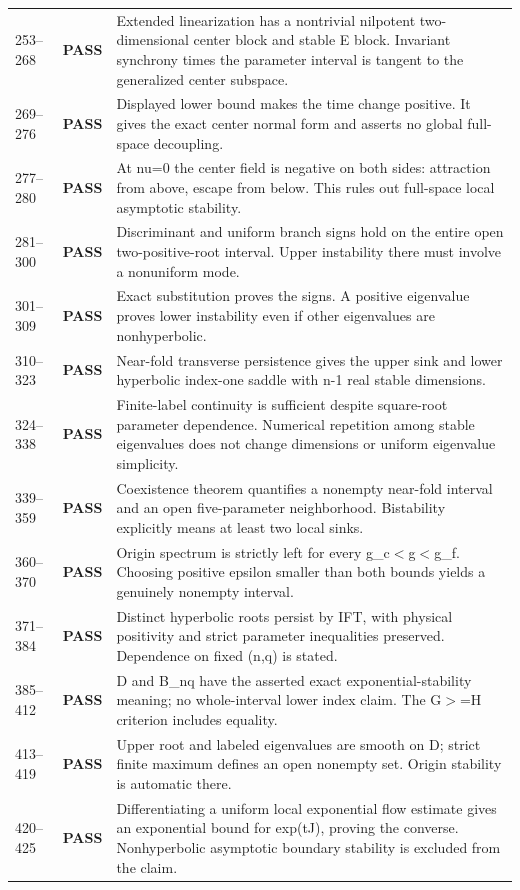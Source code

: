 \documentclass[11pt]{article}
\newcommand{\pass}{\textbf{PASS}}
\begin{document}
\begin{longtable}{@{}p{}p{}p{}@{}}
253--268 & \pass & Extended linearization has a nontrivial nilpotent two-dimensional center block and stable E block. Invariant synchrony times the parameter interval is tangent to the generalized center subspace.\\
269--276 & \pass & Displayed lower bound makes the time change positive. It gives the exact center normal form and asserts no global full-space decoupling.\\
277--280 & \pass & At nu=0 the center field is negative on both sides: attraction from above, escape from below. This rules out full-space local asymptotic stability.\\
281--300 & \pass & Discriminant and uniform branch signs hold on the entire open two-positive-root interval. Upper instability there must involve a nonuniform mode.\\
301--309 & \pass & Exact substitution proves the signs. A positive eigenvalue proves lower instability even if other eigenvalues are nonhyperbolic.\\
310--323 & \pass & Near-fold transverse persistence gives the upper sink and lower hyperbolic index-one saddle with n-1 real stable dimensions.\\
324--338 & \pass & Finite-label continuity is sufficient despite square-root parameter dependence. Numerical repetition among stable eigenvalues does not change dimensions or uniform eigenvalue simplicity.\\
339--359 & \pass & Coexistence theorem quantifies a nonempty near-fold interval and an open five-parameter neighborhood. Bistability explicitly means at least two local sinks.\\
360--370 & \pass & Origin spectrum is strictly left for every g\_c\ensuremath{<}g\ensuremath{<}g\_f. Choosing positive epsilon smaller than both bounds yields a genuinely nonempty interval.\\
371--384 & \pass & Distinct hyperbolic roots persist by IFT, with physical positivity and strict parameter inequalities preserved. Dependence on fixed (n,q) is stated.\\
385--412 & \pass & D and B\_nq have the asserted exact exponential-stability meaning; no whole-interval lower index claim. The G\ensuremath{>}=H criterion includes equality.\\
413--419 & \pass & Upper root and labeled eigenvalues are smooth on D; strict finite maximum defines an open nonempty set. Origin stability is automatic there.\\
420--425 & \pass & Differentiating a uniform local exponential flow estimate gives an exponential bound for exp(tJ), proving the converse. Nonhyperbolic asymptotic boundary stability is excluded from the claim.\\

\end{longtable}
\end{document}
